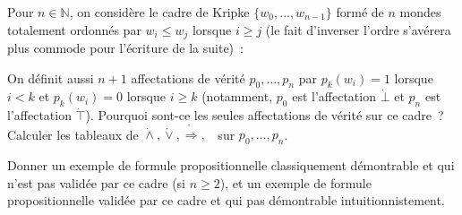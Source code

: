 \documentclass[12pt,a4paper]{article}
\theoremstyle{definition}
\newcommand{\dottedlimp}{\mathbin{\dot\Rightarrow}}
\newcommand{\dottedland}{\mathbin{\dot\land}}
\newcommand{\dottedlor}{\mathbin{\dot\lor}}
\newcommand{\dottedtop}{\mathord{\dot\top}}
\newcommand{\dottedbot}{\mathord{\dot\bot}}
\newcommand{\dottedneg}{\mathop{\dot\neg}}
\begin{document}
Pour $n\in\mathbb{N}$, on considère le cadre de Kripke
$\{w_0,\ldots,w_{n-1}\}$ formé de $n$ mondes totalement ordonnés par
$w_i \leq w_j$ lorsque $i\geq j$ (le fait d'inverser l'ordre s'avérera
plus commode pour l'écriture de la suite) :
\begin{center}
\end{center}

On définit aussi $n+1$ affectations de vérité $p_0,\ldots,p_n$ par
$p_k(w_i) = 1$ lorsque $i<k$ et $p_k(w_i) = 0$ lorsque $i\geq k$
(notamment, $p_0$ est l'affectation $\dottedbot$ et $p_n$ est
l'affectation $\dottedtop$).  Pourquoi sont-ce les seules affectations
de vérité sur ce cadre ?  Calculer les tableaux de $\dottedland,
\dottedlor, \dottedlimp, \dottedneg$ sur $p_0,\ldots,p_n$.

Donner un exemple de formule propositionnelle classiquement
démontrable et qui n'est pas validée par ce cadre (si $n\geq 2$), et
un exemple de formule propositionnelle validée par ce cadre et qui pas
démontrable intuitionnistement.
\end{document}
